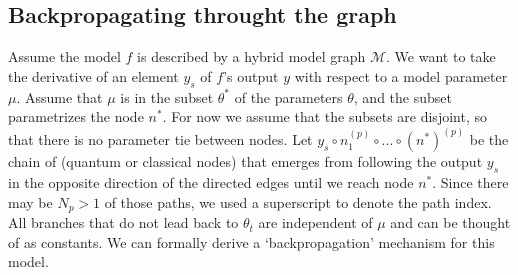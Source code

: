 \documentclass[aps,pra,10pt,twocolumn,groupedaddress,nofootinbib]{revtex4-1}
\theoremstyle{plain}
\begin{document}
\subsection{Backpropagating throught the graph}

Assume the model $f$ is described by a hybrid model graph $\mathcal{M}$. We want to take the derivative of an element $y_s$ of $f$'s output $y$ with respect to a model parameter $\mu$. Assume that $\mu$ is in the subset $\theta^*$ of the parameters $\theta$, and the subset parametrizes the node $n^*$. For now we assume that the subsets are disjoint, so that there is no parameter tie between nodes. Let $y_s \circ n^{(p)}_1 \circ ... \circ (n^*)^{(p)}$ be the chain of (quantum or classical nodes) that emerges from following the output $y_s$ in the opposite direction of the directed edges until we reach node $n^*$. Since there may be $N_p > 1$ of those paths, we used a superscript to denote the path index. All branches that do not lead back to $\theta_t$ are independent of $\mu$ and can be thought of as constants. We can formally derive a `backpropagation' mechanism for this model.\\
\end{document}
